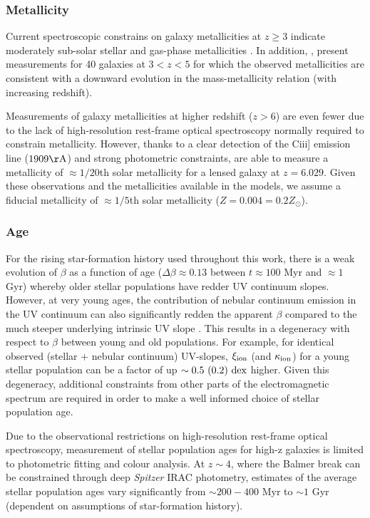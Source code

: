 \subsubsection{Metallicity}\label{sec:metallicity}
Current spectroscopic constrains on galaxy metallicities at $z \geq 3$ indicate moderately sub-solar stellar and gas-phase metallicities \citep{Shapley:2003wi,Maiolino:2008gs,Laskar:2011cc,Jones:2012kn,2012A&A...539A.136S}. In addition, \citet{Troncoso:2014kg}, present measurements for 40 galaxies at $3 < z < 5$ for which the observed metallicities are consistent with a downward evolution in the mass-metallicity relation (with increasing redshift).
    
Measurements of galaxy metallicities at higher redshift ($z>6$) are even fewer due to the lack of high-resolution rest-frame optical spectroscopy normally required to constrain metallicity. However, thanks to a clear detection of the {\sc Ciii]} emission line ($1909\rm{\AA}$) and strong photometric constraints, \citet{Stark:2014vc} are able to measure a metallicity of $\approx 1/20$th solar metallicity for a lensed galaxy at $z = 6.029$. Given these observations and the metallicities available in the \citet{Bruzual:2003ckb} models, we assume a fiducial metallicity of $\approx 1/5$th solar metallicity ($Z = 0.004 = 0.2 Z_{\odot}$).
        
\subsubsection{Age}
For the rising star-formation history used throughout this work, there is a weak evolution of $\beta$ as a function of age ($\Delta\beta \approx 0.13$ between $t \approx 100$ Myr and $\approx 1$ Gyr) whereby older stellar populations have redder UV continuum slopes. However, at very young ages, the contribution of nebular continuum emission in the UV continuum can also significantly redden the apparent $\beta$ compared to the much steeper underlying intrinsic UV slope \citep{2010Natur.468...49R}.  This results in a degeneracy with respect to $\beta$ between young and old populations. For example, for identical observed (stellar + nebular continuum) UV-slopes, $\xi_{\rm{ion}}$ (and $\kappa_{\rm{ion}}$) for a young stellar population can be a factor of up $\sim 0.5~ (0.2)~\rm{dex}$ higher. Given this degeneracy, additional constraints from other parts of the electromagnetic spectrum are required in order to make a well informed choice of stellar population age.

Due to the observational restrictions on high-resolution rest-frame optical spectroscopy, measurement of stellar population ages for high-z galaxies is limited to photometric fitting and colour analysis. At $z\sim4$, where the Balmer break can be constrained through deep \emph{Spitzer} IRAC photometry, estimates of the average stellar population ages vary significantly from $\sim 200-400$ Myr \citep{Lee:2011dw} to $\sim1$ Gyr \citep{Oesch:2013eb} (dependent on assumptions of star-formation history). 
 
